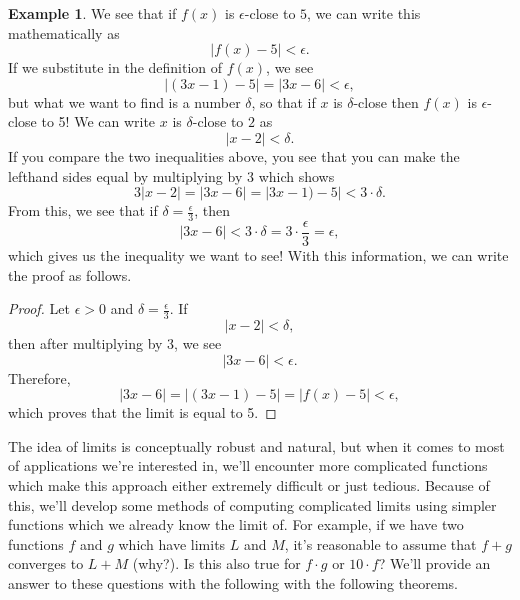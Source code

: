 \documentclass[12pt]{article}
\newcommand{\abs}[1]{ \left| #1 \right| }
\newtheorem{thm}{Theorem}[section]
\theoremstyle{definition}
\newtheorem{exmp}[thm]{Example}
\theoremstyle{plain}
\numberwithin{equation}{section}
\begin{document}
\begin{exmp}
We see that if $f(x)$ is $\epsilon$-close to $5$, we can write this mathematically as
\[
\abs{f(x)-5}<\epsilon.
\]
If we substitute in the definition of $f(x)$, we see
\[
\abs{(3x-1)-5}=\abs{3x-6}<\epsilon,
\]
but what we want to find is a number $\delta$, so that if $x$ is $\delta$-close then $f(x)$ is $\epsilon$-close to 5! We can write $x$ is $\delta$-close to $2$ as
\[
\abs{x-2}<\delta.
\]
If you compare the two inequalities above, you see that you can make the lefthand sides equal by multiplying by $3$ which shows
\[
3\abs{x-2}= \abs{3x-6}=\abs{3x-1)-5} <3\cdot\delta.
\]
From this, we see that if $\delta=\frac{\epsilon}{3}$, then
\[
\abs{3x-6}<3\cdot\delta=3\cdot\frac{\epsilon}{3}=\epsilon,
\]
which gives us the inequality we want to see! With this information, we can write the proof as follows.
\begin{proof}
  Let $\epsilon>0$ and $\delta=\frac{\epsilon}{3}$. If
  \[
\abs{x-2} < \delta,
  \]
  then after multiplying by 3, we see
  \[
\abs{3x-6} < \epsilon.
  \]
  Therefore,
  \[
    \abs{3x-6}=\abs{(3x-1)-5} =\abs{f(x)-5 }<\epsilon,
    \]
which proves that the limit is equal to 5.
\end{proof}
\end{exmp}








The idea of limits is conceptually robust and natural, but when it comes to most of applications we're interested in, we'll encounter more complicated functions which make this approach either extremely difficult or just tedious. Because of this,  we'll develop some methods of computing complicated limits using simpler functions which we already know the limit of. For example, if we have two functions $f$ and $g$ which have limits $L$ and $M$, it's reasonable to assume that $f+g$ converges to $L+M$ (why?). Is this also true for $f\cdot g$ or $10\cdot f$? We'll provide an answer to these questions with the following with the following theorems.
\end{document}
